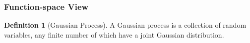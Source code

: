 \documentclass[12pt,a4paper]{report}
\theoremstyle{definition}
\newtheorem{definition}{Definition}[section]
\begin{document}
%
%
%
%
%
%
%
%
%
%

\subsubsection{Function-space View}

\begin{definition}[Gaussian Process]
A Gaussian process is a collection of random variables, any finite number of which have a joint Gaussian distribution. 
\end{definition}
\end{document}
